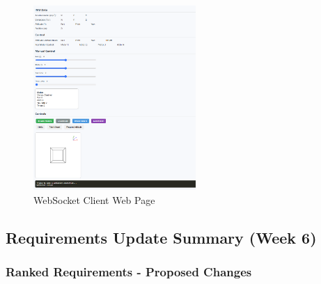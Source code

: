 \begin{figure}[H]
    \centering
    \captionsetup{justification=centering, margin=1cm}
    \includegraphics[width=0.55\textwidth]{img/websocket-page.PNG}
    \caption{WebSocket Client Web Page}
\end{figure}

\pagebreak

\subsection{Requirements Update Summary (Week 6)}
\label{app:req-changes}

\subsubsection{Ranked Requirements - Proposed Changes}

